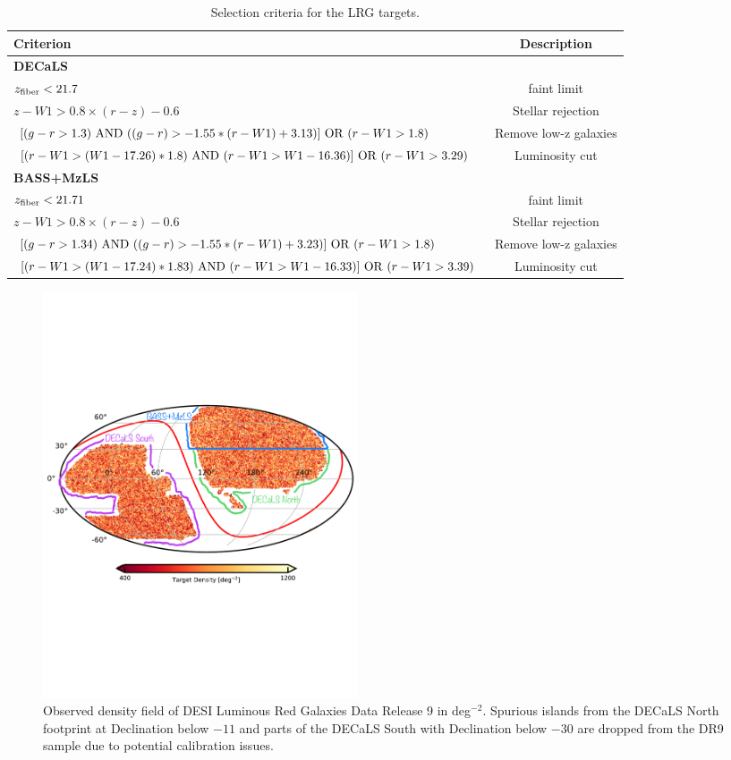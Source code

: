 \begin{table}
  \begin{center}
    \caption{Selection criteria for the LRG targets.}
    \label{tab:ts}
    \begin{tabular}{lc}
    \hline
      \textbf{Criterion} &\textbf{Description}\\
      \hline   
     \textbf{DECaLS} & \\ 
     $z_{\rm fiber} < 21.7$  & faint limit  \\
     $z - W1 > 0.8 \times (r - z) - 0.6$ & Stellar rejection  \\
     $[(g-r >1.3)~{\rm AND}~((g-r) > -1.55*(r-W1) + 3.13)]~{\rm OR}~(r -W 1 > 1.8)$ & Remove low-z galaxies \\
     $[(r-W1 > (W1 - 17.26)*1.8)~{\rm AND}~(r - W1 > W1 - 16.36)]~{\rm OR}~(r-W1 > 3.29)$ & Luminosity cut \\ 
    \hline
     \textbf{BASS+MzLS} & \\ 
     $z_{\rm fiber} < 21.71$  & faint limit  \\
     $z - W1 > 0.8 \times (r - z) - 0.6$ & Stellar rejection  \\
     $[(g-r >1.34)~{\rm AND}~((g-r) > -1.55*(r-W1) + 3.23)]~{\rm OR}~(r -W 1 > 1.8)$ & Remove low-z galaxies \\
     $[(r-W1 > (W1 - 17.24)*1.83)~{\rm AND}~(r - W1 > W1 - 16.33)]~{\rm OR}~(r-W1 > 3.39)$ & Luminosity cut \\ 
      \hline
      \end{tabular}
  \end{center}
\end{table}


\begin{figure}
    \centering
    \includegraphics[width=0.45\textwidth]{figures/lrgdens.pdf}
    \caption{Observed density field of DESI Luminous Red Galaxies Data Release 9 in deg$^{-2}$. Spurious islands from the DECaLS North footprint at Declination below $-11$ and parts of the DECaLS South with Declination below $-30$ are dropped from the DR9 sample due to potential calibration issues.}
    \label{fig:ng}
\end{figure}


